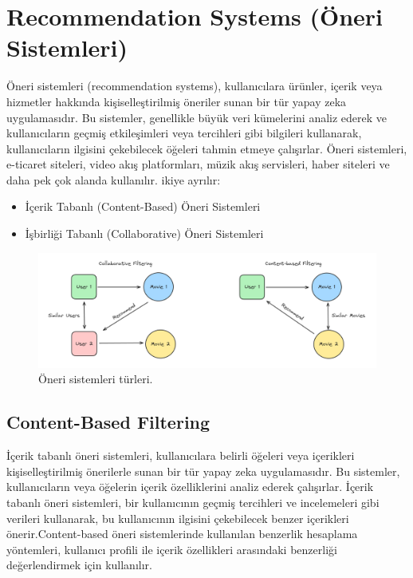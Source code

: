 \section{Recommendation Systems (Öneri Sistemleri)}
Öneri sistemleri (recommendation systems), kullanıcılara ürünler, içerik veya hizmetler hakkında kişiselleştirilmiş öneriler sunan bir tür yapay zeka uygulamasıdır. Bu sistemler, genellikle büyük veri kümelerini analiz ederek ve kullanıcıların geçmiş etkileşimleri veya tercihleri gibi bilgileri kullanarak, kullanıcıların ilgisini çekebilecek öğeleri tahmin etmeye çalışırlar. Öneri sistemleri, e-ticaret siteleri, video akış platformları, müzik akış servisleri, haber siteleri ve daha pek çok alanda kullanılır. ikiye ayrılır:

\begin{itemize}
    \item İçerik Tabanlı (Content-Based) Öneri Sistemleri
    \item İşbirliği Tabanlı (Collaborative) Öneri Sistemleri
\end{itemize}

\begin{figure}[h]
    \centering
    \includegraphics[width=1\textwidth]{images/filtering_types.png}
    \caption{Öneri sistemleri türleri.}
    \label{fig:enter-label}
\end{figure}

\newpage

\subsection{Content-Based Filtering}
İçerik tabanlı öneri sistemleri, kullanıcılara belirli öğeleri veya içerikleri kişiselleştirilmiş önerilerle sunan bir tür yapay zeka uygulamasıdır. Bu sistemler, kullanıcıların veya öğelerin içerik özelliklerini analiz ederek çalışırlar. İçerik tabanlı öneri sistemleri, bir kullanıcının geçmiş tercihleri ve incelemeleri gibi verileri kullanarak, bu kullanıcının ilgisini çekebilecek benzer içerikleri önerir.Content-based öneri sistemlerinde kullanılan benzerlik hesaplama yöntemleri, kullanıcı profili ile içerik özellikleri arasındaki benzerliği değerlendirmek için kullanılır.\\

